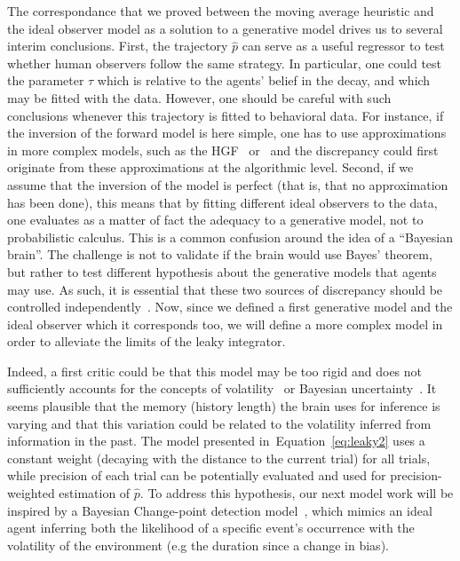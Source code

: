 \documentclass[profile,final,english,draft]{article}%
\newcommand{\citep}[1]{\parencite{#1}}
\newcommand{\seeEq}[1]{Equation~\ref{eq:#1}}
\begin{document}
The correspondance that we proved between the moving average heuristic
and the ideal observer model as a solution to a generative model drives
us to several interim conclusions.
First, the trajectory $\hat{p}$ can serve as a useful regressor
to test whether human observers follow the same strategy.
In particular, one could test the parameter $\tau$
which is relative to the agents' belief in the decay,
and which may be fitted with the data.
However, one should be careful with such conclusions whenever
this trajectory is fitted to behavioral data.
For instance, if the inversion of the forward model is here simple,
one has to use approximations in more complex models,
such as the HGF~\citep{Mathys11} or~\citep{Wilson2013,Wilson2018}
and the discrepancy could first originate from these approximations
at the algorithmic level.
Second, if we assume that the inversion of the model is perfect
(that is, that no approximation has been done),
this means that by fitting different ideal observers
to the data, one evaluates as a matter of fact the adequacy to
a generative model, not to probabilistic calculus.
This is a common confusion around the idea of a ``Bayesian brain''.
The challenge is not to validate if the brain would use Bayes' theorem,
but rather to test different hypothesis about the generative models
that agents may use. 
As such, it is essential that these two sources of discrepancy
should be controlled independently~\citep{BeckPouget}.
Now, since we defined a first generative model
and the ideal observer which it corresponds too,
we will define a more complex model
in order to alleviate the limits of the leaky integrator.

Indeed, a first critic could be that
this model may be too rigid and does not sufficiently
accounts for the concepts of volatility~\citep{Behrens07}
or Bayesian uncertainty~\citep{Vilares2011}.
It seems plausible that the memory (history length) the brain uses
for inference is varying and that this variation could be related
to the volatility inferred from information in the past.
The model presented in~\seeEq{leaky2} uses a constant weight
(decaying with the distance to the current trial)
for all trials, while precision of each trial
can be potentially evaluated and used
for precision-weighted estimation of $\hat{p}$.
To address this hypothesis, our next model work will be inspired
by a Bayesian Change-point detection model~\citep{AdamsMackay2007},
which mimics an ideal agent inferring
both the likelihood of a specific event's occurrence
with the volatility of the environment
(e.g the duration since a change in bias).
\end{document}
